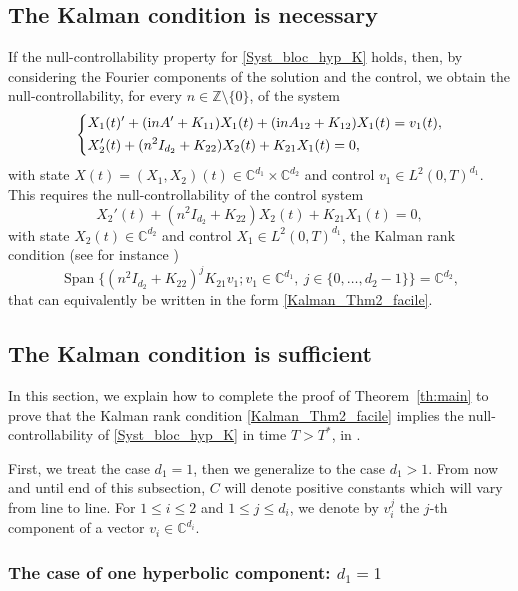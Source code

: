 \documentclass[10pt]{amsart}
\theoremstyle{plain}
\theoremstyle{definition}
\theoremstyle{remark}
\DeclareMathOperator{\Span}{Span}
\newcommand{\set}{\mathbb}
\newcommand{\Z}{\set{Z}}
\renewcommand{\C}{\set{C}}
\newcommand{\iu}{\mathrm i}
\let\originalleft\left
\let\originalright\right
\renewcommand{\left}{\mathopen{}\mathclose\bgroup\originalleft}
\renewcommand{\right}{\aftergroup\egroup\originalright}
\begin{document}
\subsection{The Kalman condition is necessary}
\label{SectionRequirementKalman}

If the null-controllability property for \eqref{Syst_bloc_hyp_K} holds, then, by
considering the Fourier components of the solution and the control, we obtain the null-controllability, for every $n\in\Z\setminus\{0\}$, of the system
\[
\left\lbrace\begin{aligned}
& X_1(t)'+ (\iu nA'+K_{11})X_1(t) + (\iu nA_{12}+K_{12})X_1(t) = v_1(t), \\
& X_2'(t)+(n^2 I_{d_2}+K_{22})X_2(t)+ K_{21} X_1(t)=0,
\end{aligned}\right.
\]
with state $X(t)=(X_1,X_2)(t)\in\C^{d_1}\times\C^{d_2}$ and control $v_1 \in L^2(0,T)^{d_1}$. This requires the null-controllability of the control system
\[
X_2'(t)+(n^2 I_{d_2}+ K_{22})X_2(t) + K_{21} X_1(t)=0,
\]
with state $X_2(t) \in \C^{d_2}$ and control $X_1 \in L^2(0,T)^{d_1}$, \ie the Kalman rank condition (see for instance \cite[Th.\,1.16]{coron_2007})
\[
\Span\{ (n^2 I_{d_2}+K_{22})^j K_{21} v_1 ; v_1 \in \C^{d_1},\ j \in \{0,\dots,d_2-1\}\}=\C^{d_2},
\]
that can equivalently be written in the form \eqref{Kalman_Thm2_facile}.

\subsection{The Kalman condition is sufficient}
\label{subsec:K_S_K}

In this section, we explain how to complete the proof of Theorem~\ref{th:main} to prove that the Kalman rank condition \eqref{Kalman_Thm2_facile} implies the null-controllability of \eqref{Syst_bloc_hyp_K} in time $T>T^\ast$, in .

First, we treat the case $d_1 = 1$, then we generalize to the case $d_1 >1$. From now and until end of this subsection, $C$ will denote positive constants which will vary from line to line. For $1 \leq i \leq 2$ and $1 \leq j \leq d_i$, we denote by $v_{i}^j$ the $j$-th component of a vector $v_i \in \C^{d_i}$.

\subsubsection{The case of one hyperbolic component: $d_1 = 1$}
\end{document}
